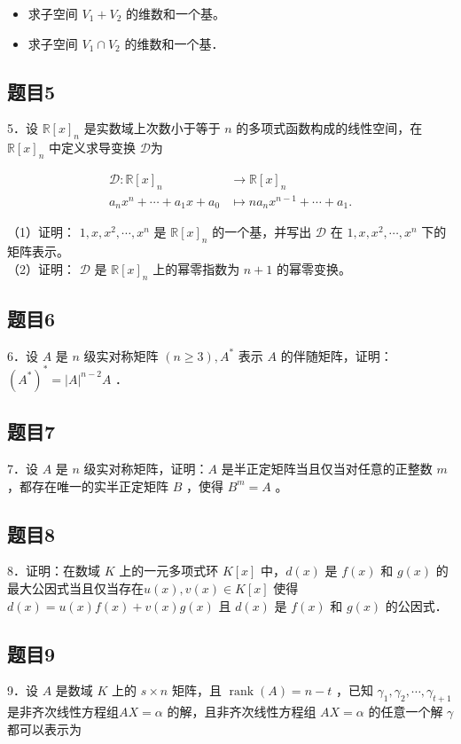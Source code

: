 \documentclass{article}
\begin{document}
\begin{itemize}
  \item[（1）] 求子空间 \(V_{1}+V_{2}\) 的维数和一个基。
  \item[（2）] 求子空间 \(V_{1} \cap V_{2}\) 的维数和一个基．
\end{itemize}

\subsection{题目5}
5．设 \(\mathbb{R}[x]_{n}\) 是实数域上次数小于等于 \(n\) 的多项式函数构成的线性空间，在 \(\mathbb{R}[x]_{n}\) 中定义求导变换 \(\mathcal{D}\)为

\[
\begin{aligned}
\mathcal{D}: \mathbb{R}[x]_{n} & \rightarrow \mathbb{R}[x]_{n} \\
a_{n} x^{n}+\cdots+a_{1} x+a_{0} & \mapsto n a_{n} x^{n-1}+\cdots+a_{1} .
\end{aligned}
\]

（1）证明： \(1, x, x^{2}, \cdots, x^{n}\) 是 \(\mathbb{R}[x]_{n}\) 的一个基，并写出 \(\mathcal{D}\) 在 \(1, x, x^{2}, \cdots, x^{n}\) 下的矩阵表示。\\
（2）证明： \(\mathcal{D}\) 是 \(\mathbb{R}[x]_{n}\) 上的幂零指数为 \(n+1\) 的幂零变换。

\subsection{题目6}
6．设 \(A\) 是 \(n\) 级实对称矩阵 \((n \geq 3), A^{*}\) 表示 \(A\) 的伴随矩阵，证明：\(\left(A^{*}\right)^{*}=|A|^{n-2} A\) ．

\subsection{题目7}
7．设 \(A\) 是 \(n\) 级实对称矩阵，证明：\(A\) 是半正定矩阵当且仅当对任意的正整数 \(m\) ，都存在唯一的实半正定矩阵 \(B\) ，使得 \(B^{m}=A\) 。

\subsection{题目8}
8．证明：在数域 \(K\) 上的一元多项式环 \(K[x]\) 中，\(d(x)\) 是 \(f(x)\) 和 \(g(x)\) 的最大公因式当且仅当存在\(u(x), v(x) \in K[x]\) 使得 \(d(x)=u(x) f(x)+v(x) g(x)\) 且 \(d(x)\) 是 \(f(x)\) 和 \(g(x)\) 的公因式．

\subsection{题目9}
9．设 \(A\) 是数域 \(K\) 上的 \(s \times n\) 矩阵，且 \(\operatorname{rank}(A)=n-t\) ，已知 \(\gamma_{1}, \gamma_{2}, \cdots, \gamma_{t+1}\) 是非齐次线性方程组\(A X=\alpha\) 的解，且非齐次线性方程组 \(A X=\alpha\) 的任意一个解 \(\gamma\) 都可以表示为
\end{document}
